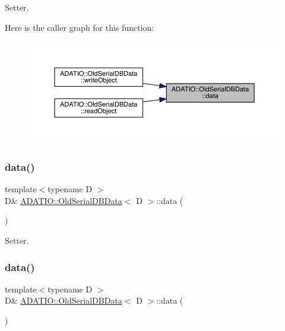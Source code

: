 Setter. 

Here is the caller graph for this function\+:
\nopagebreak
\begin{figure}[H]
\begin{center}
\leavevmode
\includegraphics[width=350pt]{da/dbc/classADATIO_1_1OldSerialDBData_ad917fd5898616290b7c0d30cb878850f_icgraph}
\end{center}
\end{figure}
\mbox{\label{classADATIO_1_1OldSerialDBData_ad917fd5898616290b7c0d30cb878850f}} 
\subsubsection{\texorpdfstring{data()}{data()}\hspace{0.1cm}{\footnotesize\ttfamily [2/6]}}
{\footnotesize\ttfamily template$<$typename D $>$ \\
D\& \mbox{\hyperlink{classADATIO_1_1OldSerialDBData}{A\+D\+A\+T\+I\+O\+::\+Old\+Serial\+D\+B\+Data}}$<$ D $>$\+::data (\begin{DoxyParamCaption}{ }\end{DoxyParamCaption})\hspace{0.3cm}{\ttfamily [inline]}}



Setter. 

\mbox{\label{classADATIO_1_1OldSerialDBData_ad917fd5898616290b7c0d30cb878850f}} 
\subsubsection{\texorpdfstring{data()}{data()}\hspace{0.1cm}{\footnotesize\ttfamily [3/6]}}
{\footnotesize\ttfamily template$<$typename D $>$ \\
D\& \mbox{\hyperlink{classADATIO_1_1OldSerialDBData}{A\+D\+A\+T\+I\+O\+::\+Old\+Serial\+D\+B\+Data}}$<$ D $>$\+::data (\begin{DoxyParamCaption}{ }\end{DoxyParamCaption})\hspace{0.3cm}{\ttfamily [inline]}}



